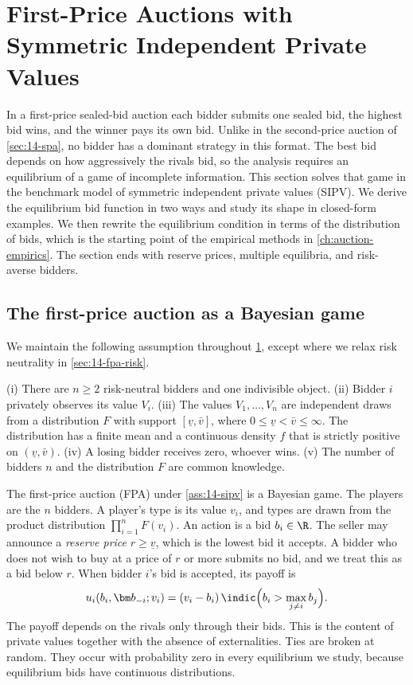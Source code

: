\section{First-Price Auctions with Symmetric Independent Private Values}\label{sec:14-fpa}

In a first-price sealed-bid auction each bidder submits one sealed bid, the highest bid wins, and the winner pays its own bid. Unlike in the second-price auction of \cref{sec:14-spa}, no bidder has a dominant strategy in this format. The best bid depends on how aggressively the rivals bid, so the analysis requires an equilibrium of a game of incomplete information. This section solves that game in the benchmark model of symmetric independent private values (SIPV). We derive the equilibrium bid function in two ways and study its shape in closed-form examples. We then rewrite the equilibrium condition in terms of the distribution of bids, which is the starting point of the empirical methods in \cref{ch:auction-empirics}. The section ends with reserve prices, multiple equilibria, and risk-averse bidders.

\subsection{The first-price auction as a Bayesian game}\label{sec:14-fpa-game}

We maintain the following assumption throughout \cref{sec:14-fpa}, except where we relax risk neutrality in \cref{sec:14-fpa-risk}.

\begin{assumption}\label{ass:14-sipv}
(i) There are $n\ge 2$ risk-neutral bidders and one indivisible object.
(ii) Bidder $i$ privately observes its value $V_i$.
(iii) The values $V_1,\dots,V_n$ are independent draws from a distribution $F$ with support $[\underline v,\bar v]$, where $0\le\underline v<\bar v\le\infty$. The distribution has a finite mean and a continuous density $f$ that is strictly positive on $(\underline v,\bar v)$.
(iv) A losing bidder receives zero, whoever wins.
(v) The number of bidders $n$ and the distribution $F$ are common knowledge.
\end{assumption}

The first-price auction (FPA) under \cref{ass:14-sipv} is a Bayesian game. The players are the $n$ bidders. A player's type is its value $v_i$, and types are drawn from the product distribution $\prod_{i=1}^n F(v_i)$. An action is a bid $b_i\in\R$. The seller may announce a \emph{reserve price} $r\ge\underline v$, which is the lowest bid it accepts. A bidder who does not wish to buy at a price of $r$ or more submits no bid, and we treat this as a bid below $r$. When bidder $i$'s bid is accepted, its payoff is
\begin{equation}\label{eq:14-fpa-payoff}
u_i(b_i,\bm b_{-i};v_i)=(v_i-b_i)\,\indic\Big(b_i>\max_{j\neq i}b_j\Big).
\end{equation}
The payoff depends on the rivals only through their bids. This is the content of private values together with the absence of externalities. Ties are broken at random. They occur with probability zero in every equilibrium we study, because equilibrium bids have continuous distributions.

